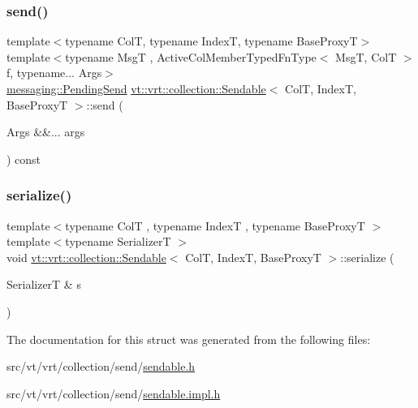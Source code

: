 \mbox{\label{structvt_1_1vrt_1_1collection_1_1_sendable_a65e5494a18b398b52f12c056cff1dc16}} 
\subsubsection{\texorpdfstring{send()}{send()}\hspace{0.1cm}{\footnotesize\ttfamily [6/6]}}
{\footnotesize\ttfamily template$<$typename ColT, typename IndexT, typename Base\+ProxyT$>$ \\
template$<$typename MsgT , Active\+Col\+Member\+Typed\+Fn\+Type$<$ Msg\+T, Col\+T $>$ f, typename... Args$>$ \\
\hyperlink{structvt_1_1messaging_1_1_pending_send}{messaging\+::\+Pending\+Send} \hyperlink{structvt_1_1vrt_1_1collection_1_1_sendable}{vt\+::vrt\+::collection\+::\+Sendable}$<$ ColT, IndexT, Base\+ProxyT $>$\+::send (\begin{DoxyParamCaption}\item[{Args \&\&...}]{args }\end{DoxyParamCaption}) const}

\mbox{\label{structvt_1_1vrt_1_1collection_1_1_sendable_ae8e7cff31e30aa7cda6b958c1a81ddc3}} 
\subsubsection{\texorpdfstring{serialize()}{serialize()}}
{\footnotesize\ttfamily template$<$typename ColT , typename IndexT , typename Base\+ProxyT $>$ \\
template$<$typename SerializerT $>$ \\
void \hyperlink{structvt_1_1vrt_1_1collection_1_1_sendable}{vt\+::vrt\+::collection\+::\+Sendable}$<$ ColT, IndexT, Base\+ProxyT $>$\+::serialize (\begin{DoxyParamCaption}\item[{SerializerT \&}]{s }\end{DoxyParamCaption})}



The documentation for this struct was generated from the following files\+:\begin{DoxyCompactItemize}
\item 
src/vt/vrt/collection/send/\hyperlink{sendable_8h}{sendable.\+h}\item 
src/vt/vrt/collection/send/\hyperlink{sendable_8impl_8h}{sendable.\+impl.\+h}\end{DoxyCompactItemize}
